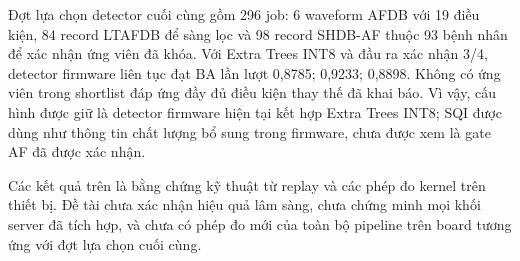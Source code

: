 \documentclass[12pt,a4paper,oneside]{report}
\begin{document}
Đợt lựa chọn detector cuối cùng gồm 296 job: 6 waveform AFDB với 19 điều kiện, 84 record LTAFDB để sàng lọc và 98 record SHDB-AF thuộc 93 bệnh nhân để xác nhận ứng viên đã khóa. Với Extra Trees INT8 và đầu ra xác nhận 3/4, detector firmware liên tục đạt BA lần lượt 0,8785; 0,9233; 0,8898. Không có ứng viên trong shortlist đáp ứng đầy đủ điều kiện thay thế đã khai báo. Vì vậy, cấu hình được giữ là detector firmware hiện tại kết hợp Extra Trees INT8; SQI được dùng như thông tin chất lượng bổ sung trong firmware, chưa được xem là gate AF đã được xác nhận.

Các kết quả trên là bằng chứng kỹ thuật từ replay và các phép đo kernel trên thiết bị. Đề tài chưa xác nhận hiệu quả lâm sàng, chưa chứng minh mọi khối server đã tích hợp, và chưa có phép đo mới của toàn bộ pipeline trên board tương ứng với đợt lựa chọn cuối cùng.

\tableofcontents
\listoftables
\listoffigures
\clearpage
\end{document}
